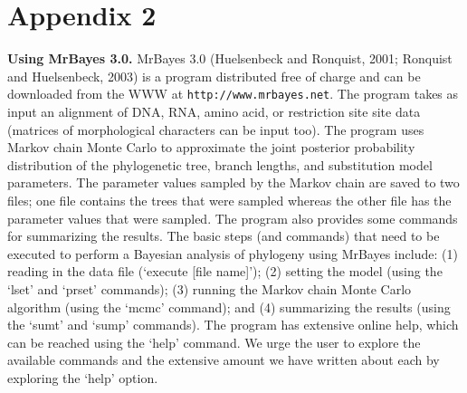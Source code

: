 \documentclass{svmult}
\begin{document}
\newpage

\section*{Appendix 2}

{\bf Using MrBayes 3.0.} MrBayes 3.0 (Huelsenbeck and Ronquist, 2001; Ronquist and Huelsenbeck, 2003) is a program distributed free
of charge and can be downloaded from the WWW at {\tt http://www.mrbayes.net}. The program takes as input an alignment of DNA,
RNA, amino acid, or restriction site site data (matrices of morphological characters can be input too). The program uses Markov chain
Monte Carlo to approximate the joint posterior probability distribution of the phylogenetic tree, branch lengths, and substitution model
parameters. The parameter values sampled by the Markov chain are saved to two files; one file contains the trees that were sampled
whereas the other file has the parameter values that were sampled. The program also provides some commands for summarizing the
results. The basic steps (and commands) that need to be executed to perform a Bayesian analysis of phylogeny using MrBayes include:
(1) reading in the data file (`execute [file name]'); (2) setting the model (using the `lset' and `prset' commands); (3) running the 
Markov chain Monte Carlo algorithm (using the `mcmc' command); and (4) summarizing the results (using the `sumt' and `sump' commands).
The program has extensive online help, which can be reached using the `help' command. We urge the user to explore the available commands
and the extensive amount we have written about each by exploring the `help' option.

\bigskip
\end{document}
